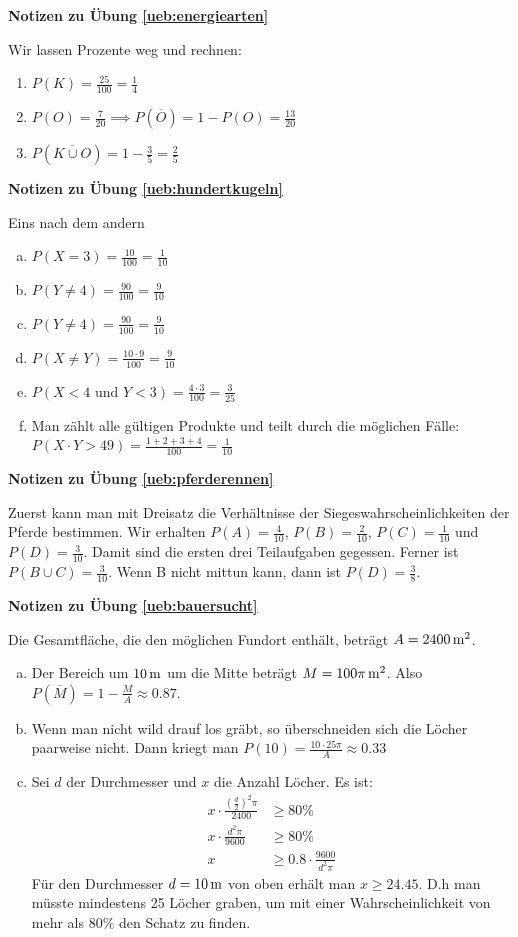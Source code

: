 \documentclass[%
<<<<<<< Updated upstream
11pt,%
twoside,%
titlepage,%
german,%
=======
11pt,%
twoside,%
titlepage,%
swissgerman,%
>>>>>>> Stashed changes
headsepline%
]{scrartcl}
\newcommand{\faReturnGray}{\textcolor{gray}{\faMailReply}} %
\theoremstyle{definition}
\theoremstyle{plain}
\newcommand{\concatueb}[1]{ueb:#1}%
\newcommand{\concatlsg}[1]{lsg:#1}%
\newenvironment{lsg}[1]{%
    \par\noindent\textbf{Notizen zu Übung \ref{\concatueb{#1}}}\label{\concatlsg{#1}}
    \hfill\hyperref[\concatueb{#1}]{\faReturnGray}\par %
}{%
    \par%
}
\newcommand{\concatueb}[1]{ueb:#1}%
\newcommand{\concatlsg}[1]{lsg:#1}%
\newenvironment{lsg}[1]{%
    \par\noindent\textbf{Notizen zu Übung \ref{\concatueb{#1}}.}%
    \label{\concatlsg{#1}}
}{%
    \par%
}
\begin{document}
\begin{lsg}{energiearten}
Wir lassen Prozente weg und rechnen:
\begin{enumerate}
\item $P(K)=\frac{25}{100}=\frac{1}{4}$
\item $P(O)=\frac{7}{20}\implies P(\overline{O})=1-P(O)=\frac{13}{20}$
\item $P(\overline{K\cup O})=1-\frac{3}{5}=\frac{2}{5}$
\end{enumerate}
\end{lsg}

\begin{lsg}{hundertkugeln}
Eins nach dem andern
\begin{enumerate}[a)]
\item $P(X=3)=\frac{10}{100}=\frac{1}{10}$
\item $P(Y\neq4)=\frac{90}{100}=\frac{9}{10}$
\item $P(Y\neq4)=\frac{90}{100}=\frac{9}{10}$
\item $P(X \neq Y)=\frac{10\cdot9}{100}=\frac{9}{10}$
\item $P(X < 4\text{ und } Y < 3)=\frac{4\cdot 3}{100}=\frac{3}{25}$
\item Man z\"ahlt alle g\"ultigen Produkte und teilt durch die m\"oglichen F\"alle: $P(X\cdot Y > 49)=\frac{1+2+3+4}{100}=\frac{1}{10}$
\end{enumerate}
\end{lsg}

\begin{lsg}{pferderennen}
Zuerst kann man mit Dreisatz die Verh\"altnisse der Siegeswahrscheinlichkeiten der Pferde bestimmen. Wir erhalten $P(A)=\frac{4}{10}$, $P(B)=\frac{2}{10}$, $P(C)=\frac{1}{10}$ und $P(D)=\frac{3}{10}$. Damit sind die ersten drei Teilaufgaben gegessen. Ferner ist $P(B\cup C)=\frac{3}{10}$. Wenn B nicht mittun kann, dann ist $P(D)=\frac{3}{8}$.
\end{lsg}

\begin{lsg}{bauersucht}
Die Gesamtfl\"ache, die den m\"oglichen Fundort enth\"alt, betr\"agt $A=\unit[2400]{m^{2}}$.
\begin{enumerate}[a)]
\item Der Bereich um $\unit[10]{m}$ um die Mitte betr\"agt $M=\unit[100\pi]{m^{2}}$. Also $P(\overline{M})=1-\frac{M}{A}\approx0.87$.
\item Wenn man nicht wild drauf los gr\"abt, so \"uberschneiden sich die L\"ocher paarweise nicht. Dann kriegt man $P(10)=\frac{10\cdot25\pi}{A}\approx0.33$
\item Sei $d$ der Durchmesser und $x$ die Anzahl L\"ocher. Es ist:
\begin{align*}
x\cdot\frac{(\frac{d}{2})^{2}\pi}{2400} &\geq80\%\\
x\cdot\frac{d^{2}\pi}{9600} &\geq80\%\\
x &\geq 0.8\cdot\frac{9600}{d^{2}\pi}
\end{align*}
F\"ur den Durchmesser $d=\unit[10]{m}$ von oben erh\"alt man $x\geq24.45$. D.h man m\"usste mindestens 25 L\"ocher graben, um mit einer Wahrscheinlichkeit von mehr als $80\%$ den Schatz zu finden.
\end{enumerate}
\end{lsg}
\end{document}
